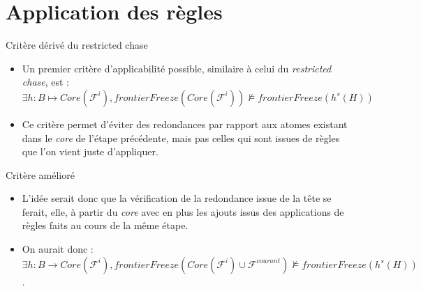 \section{Application des règles}

\begin{frame}{Critère dérivé du restricted chase}
\begin{itemize}
\item Un premier critère d'applicabilité possible, similaire à celui du \textit{restricted chase}, est : $\exists h : B \mapsto Core(\mathcal{F}^i), frontierFreeze(Core(\mathcal{F}^i)) \not\vDash frontierFreeze(h^s(H))$

\item Ce critère permet d'éviter des redondances par rapport aux atomes existant dans le \textit{core} de l'étape précédente, mais pas celles qui sont issues de règles que l'on vient juste d'appliquer.


\end{itemize}
\end{frame}

\begin{frame}{Critère amélioré}
\begin{itemize}
\item L'idée serait donc que la vérification de la redondance issue de la tête se ferait, elle, à partir du \textit{core} avec en plus les ajouts issus des applications de règles faits au cours de la même étape. 
\item On aurait donc :
$\exists h : B \rightarrow Core(\mathcal{F}^i), frontierFreeze(Core(\mathcal{F}^{i})\cup\mathcal{F}^{courant}) \not\vDash frontierFreeze(h^s(H))$.
\end{itemize}
\end{frame}

